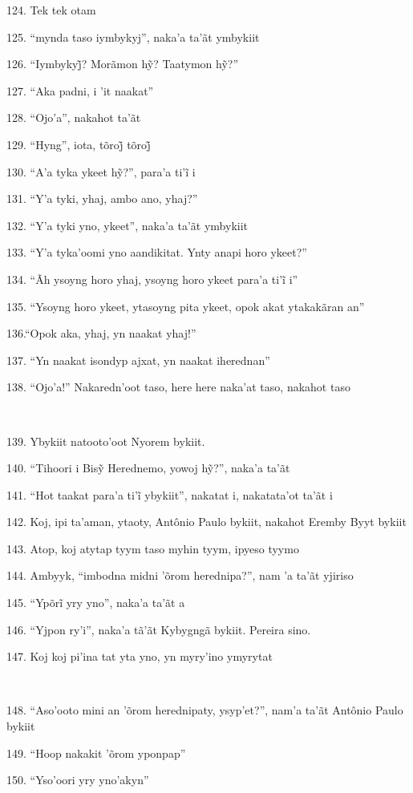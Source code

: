 124. Tek tek otam

125. ``mynda taso iymbykyj'', naka'a ta'ãt ymbykiit

126. ``Iymbykyj̃? Morãmon hỹ? Taatymon hỹ?''

127. ``Aka padni, i 'it naakat''

128. ``Ojo'a'', nakahot ta'ãt

129. ``Hyng'', iota, tõroj̃ tõroj̃

130. ``A’a tyka ykeet hỹ?'', para’a ti’ĩ i

131. ``Y'a tyki, yhaj, ambo ano, yhaj?''

132. ``Y'a tyki yno, ykeet'', naka'a ta'ãt ymbykiit

133. ``Y'a tyka'oomi yno aandikitat. Ynty anapi horo ykeet?''

134. ``Ãh ysoyng horo yhaj, ysoyng horo ykeet para’a ti’ĩ i''

135. ``Ysoyng horo ykeet, ytasoyng pita ykeet, opok akat ytakakãran an''

136.``Opok aka, yhaj, yn naakat yhaj!''

137. ``Yn naakat isondyp ajxat, yn naakat iherednan''

138. ``Ojo'a!'' Nakaredn'oot taso, here here naka'at taso, nakahot taso

~

139. Ybykiit natooto'oot Nyorem bykiit.

140. ``Tihoori i Bisỹ Herednemo, yowoj hỹ?'', naka’a ta’ãt

141. ``Hot taakat para’a ti’ĩ ybykiit'', nakatat i, nakatata’ot ta’ãt i

142. Koj, ipi ta'aman, ytaoty, Antônio Paulo bykiit, nakahot Eremby Byyt bykiit

143. Atop, koj atytap tyym taso myhin tyym, ipyeso tyymo

144. Ambyyk, ``imbodna midni 'õrom herednipa?'', nam 'a ta'ãt yjiriso

145. ``Ypõrĩ yry yno'', naka’a ta’ãt a

146. ``Yjpon ry'i'', naka'a tã'ãt Kybygngã bykiit. Pereira sino.

147. Koj koj pi'ina tat yta yno, yn myry'ino ymyrytat

~

148. ``Aso'ooto mini an 'õrom herednipaty, ysyp'et?'', nam'a ta'ãt
Antônio Paulo bykiit

149. ``Hoop nakakit 'õrom yponpap''

150. ``Yso'oori yry yno'akyn''

